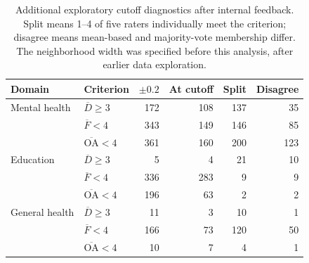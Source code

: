 \begin{table}[htbp]
\centering\small
\caption{Additional exploratory cutoff diagnostics after internal feedback. Split means 1--4 of five raters individually meet the criterion; disagree means mean-based and majority-vote membership differ. The neighborhood width was specified before this analysis, after earlier data exploration.}
\label{tab:cutoffs}
\begin{tabular}{llrrrr}
\toprule
Domain & Criterion & $\pm0.2$ & At cutoff & Split & Disagree \\
\midrule
Mental health & $\overline D\geq3$ & 172 & 108 & 137 & 35 \\
 & $\overline F<4$ & 343 & 149 & 146 & 85 \\
 & $\overline{\mathrm{OA}}<4$ & 361 & 160 & 200 & 123 \\
Education & $\overline D\geq3$ & 5 & 4 & 21 & 10 \\
 & $\overline F<4$ & 336 & 283 & 9 & 9 \\
 & $\overline{\mathrm{OA}}<4$ & 196 & 63 & 2 & 2 \\
General health & $\overline D\geq3$ & 11 & 3 & 10 & 1 \\
 & $\overline F<4$ & 166 & 73 & 120 & 50 \\
 & $\overline{\mathrm{OA}}<4$ & 10 & 7 & 4 & 1 \\
\bottomrule
\end{tabular}
\end{table}
